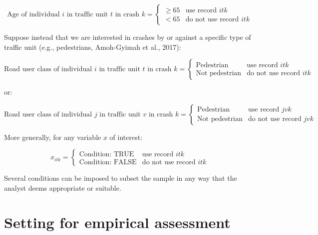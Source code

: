 \documentclass[]{elsarticle} %
\begin{document}
\begin{equation}
\label{eq:sampling-age}
\text{Age of individual } i \text{ in traffic unit } t \text{ in crash } k = 
\begin{cases}
\ge 65 & \text{use record } itk\\
< 65 & \text{do not use record } itk
\end{cases}
\end{equation}

Suppose instead that we are interested in crashes by or against a
specific type of traffic unit (e.g., pedestrians, Amoh-Gyimah et al.,
2017):

\begin{equation}
\label{eq:sampling-pedestrian}
\text{Road user class of individual } i \text{ in traffic unit } t \text{ in crash } k = 
\begin{cases}
\text{Pedestrian} & \text{use record } itk\\
\text{Not pedestrian} & \text{do not use record } itk
\end{cases}
\end{equation}

\noindent or:

\begin{equation}
\label{eq:sampling-pedestrian-opponent}
\text{Road user class of individual } j \text{ in traffic unit } v \text{ in crash } k = 
\begin{cases}
\text{Pedestrian} & \text{use record } jvk\\
\text{Not pedestrian} & \text{do not use record } jvk
\end{cases}
\end{equation}

More generally, for any variable \(x\) of interest:

\begin{equation}
\label{eq:sampling-general}
x_{itk} = 
\begin{cases}
\text{Condition: TRUE} & \text{use record } itk\\
\text{Condition: FALSE} & \text{do not use record } itk
\end{cases}
\end{equation}

Several conditions can be imposed to subset the sample in any way that
the analyst deems appropriate or suitable.

\hypertarget{sec:application}{%
\section{Setting for empirical assessment}\label{sec:application}}
\end{document}
